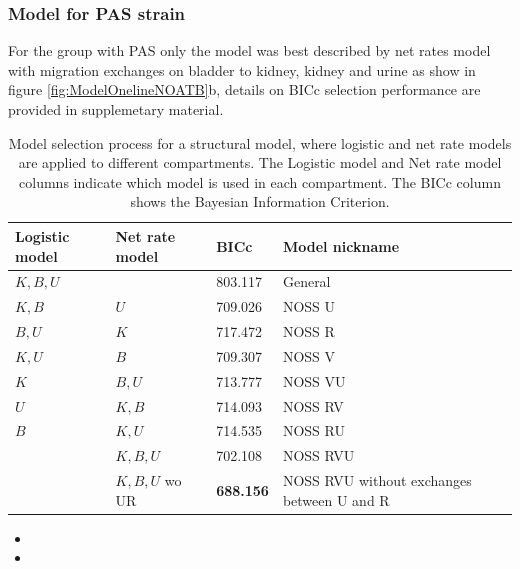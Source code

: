 \documentclass{article}
\begin{document}
\subsubsection{Model for PAS strain}

For the group with PAS only the model was best described by net rates model with 
migration exchanges on bladder to kidney, kidney and urine as show in figure \ref{fig:ModelOnelineNOATB}b, details on BICc selection performance are provided in supplemetary material.


\begin{table}
	\begin{tabular}{|l|l|l|l|}
		\hline
		Logistic model & Net rate model & BICc & Model nickname\\ \hline
		$K, B, U$ &           & 803.117 & General \\
		$K, B   $ & $U   $ & 709.026 & NOSS U \\
		$B, U   $ & $K      $ & 717.472 & NOSS R \\
		$K, U   $ & $B      $ & 709.307 & NOSS V \\
		$K      $ & $B, U   $ & 713.777 & NOSS VU \\
		$U      $ & $K, B   $ & 714.093 & NOSS RV \\
		$B      $ & $K, U   $ & 714.535 & NOSS RU \\
		& $K, B, U$ & 702.108 & NOSS RVU \\
		$       $ & $K, B, U$ wo UR & \textbf{688.156} & NOSS RVU without exchanges between U and R \\
		\hline
	\end{tabular}
	\label{tab:ModelSelectionPASLogvsNet}
	\caption{Model selection process for a structural model, where logistic and net rate models are applied to different compartments. The Logistic model and Net rate model columns indicate which model is used in each compartment. The BICc column shows the Bayesian Information Criterion. }
\end{table}


\begin{itemize}
	\item {}
	\item {}
\end{itemize}
\end{document}
